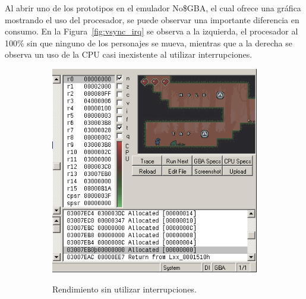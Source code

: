 Al abrir uno de los prototipos en el emulador No\$GBA, el cual ofrece una gráfica mostrando el uso del procesador, se puede observar una importante diferencia en consumo. En la Figura~\ref{fig:vsync_irq} se observa a la izquierda, el procesador al 100\% sin que ninguno de los personajes se mueva, mientras que a la derecha se observa un uso de la CPU casi inexistente al utilizar interrupciones.

\begin{figure}[h]
	\centering
	\begin{subfigure}[b]{0.45\textwidth}
		\centering
		\includegraphics[width=\textwidth]{capitulos/capitulo5/wout_irq.png}
		\label{fig:wout_irq}
		\caption{Rendimiento sin utilizar interrupciones.}
	\end{subfigure}
	\hfill
	\begin{subfigure}[b]{0.45\textwidth}
		\centering

\end{subfigure}
\end{figure}

